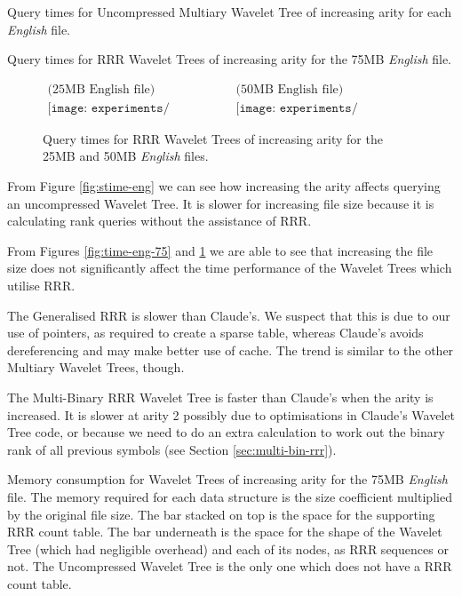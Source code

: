 \clearpage
			{Query times for Uncompressed Multiary Wavelet Tree 
			of increasing arity for each \emph{English} file.}
		
			{Query times for RRR Wavelet Trees of increasing arity
			for the 75MB \emph{English} file.}
	
			\begin{figure}[h]
			\begin{center}
			$\begin{array}{cc}
			\mbox{(25MB English file)} & 
			\mbox{(50MB English file)} \\
			\texttt{[image: experiments/time\_english\_25MB]} &
			\texttt{[image: experiments/time\_english\_50MB]}
			\end{array}$
			\end{center}
			\caption{Query times for RRR Wavelet Trees of increasing arity
			for the 25MB and 50MB \emph{English} files.}
			\label{fig:time-eng-25-50}
			\end{figure}
			
From Figure \ref{fig:stime-eng} we can see how increasing the arity affects
querying an uncompressed Wavelet Tree. It is slower for increasing file size
because it is calculating rank queries without the assistance of RRR.

From Figures \ref{fig:time-eng-75} and \ref{fig:time-eng-25-50} we are able 
to see that increasing the file size does not significantly affect the time
performance of the Wavelet Trees which utilise RRR.

The Generalised RRR is slower than Claude's. We suspect that this is due to our 
use of pointers, as required to create a sparse table, whereas Claude's avoids 
dereferencing and may make better use of cache. The trend is similar to the
other Multiary Wavelet Trees, though.

The Multi-Binary RRR Wavelet Tree is faster than Claude's when the arity is 
increased. It is slower at arity 2 possibly due to optimisations in Claude's
Wavelet Tree code, or because we need to do an extra calculation to work out
the binary rank of all previous symbols (see Section 
\ref{sec:multi-bin-rrr}).

\clearpage
			{Memory consumption for Wavelet Trees of increasing arity for
			the 75MB \emph{English} file. 
			The memory required for each data structure is the size coefficient 
			multiplied by the original file size.
			The bar stacked on top is the space for
			the supporting RRR count table. The bar underneath is the space for
			the shape of the Wavelet Tree (which had negligible overhead) and 
			each of its
			nodes, as RRR sequences or not. The Uncompressed Wavelet Tree is
			the only one which does not have a RRR count table.}
		
